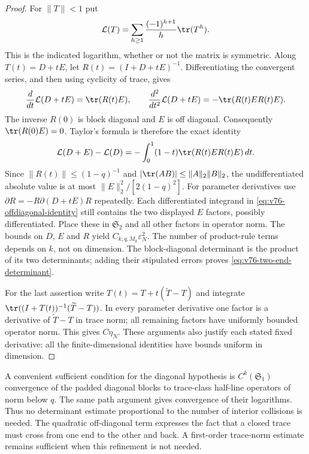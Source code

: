 \begin{proof}
For $\|T\|<1$ put
\[
 \mathcal L(T)=\sum_{h\ge1}\frac{(-1)^{h+1}}h\tr(T^h).
\]
This is the indicated logarithm, whether or not the matrix is symmetric.
Along $T(t)=D+tE$, let $R(t)=(I+D+tE)^{-1}$.  Differentiating the
convergent series, and then using cyclicity of trace, gives
\[
 \frac{d}{dt}\mathcal L(D+tE)=\tr(R(t)E),\qquad
 \frac{d^2}{dt^2}\mathcal L(D+tE)=-\tr(R(t)ER(t)E).
\]
The inverse $R(0)$ is block diagonal and $E$ is off diagonal.
Consequently $\tr(R(0)E)=0$.  Taylor's formula is therefore the exact
identity
\begin{equation}\label{eq:v76-offdiagonal-identity}
 \mathcal L(D+E)-\mathcal L(D)
 =-\int_0^1(1-t)\tr(R(t)ER(t)E)\,dt.
\end{equation}
Since $\|R(t)\|\le(1-q)^{-1}$ and
$|\tr(AB)|\le\|A\|_2\|B\|_2$, the undifferentiated absolute
value is at most $\|E\|_2^2/[2(1-q)^2]$.
For parameter derivatives use
$\partial R=-R\partial(D+tE)R$ repeatedly.  Each differentiated
integrand in \eqref{eq:v76-offdiagonal-identity} still contains the two
displayed $E$ factors, possibly differentiated.  Place these in
$\mathfrak S_2$ and all other factors in operator norm.  The bounds
on $D$, $E$ and $R$ yield $C_{k,q,M_k}\varepsilon_N^2$.
The number of product-rule terms depends on $k$, not on dimension.
The block-diagonal determinant is the product of its two determinants;
adding their stipulated errors proves \eqref{eq:v76-two-end-determinant}.

For the last assertion write $T(t)=T+t(\widetilde T-T)$ and integrate
$\tr((I+T(t))^{-1}(\widetilde T-T))$.  In every parameter derivative
one factor is a derivative of $\widetilde T-T$ in trace norm; all
remaining factors have uniformly bounded operator norm.  This gives
$C\eta_N$.  These arguments also justify each stated fixed derivative:
all the finite-dimensional identities have bounds uniform in dimension.
\end{proof}

A convenient sufficient condition for the diagonal hypothesis is
$C^k(\mathfrak S_1)$ convergence of the padded diagonal blocks to
trace-class half-line operators of norm below $q$.  The same path
argument gives convergence of their logarithms.  Thus no determinant
estimate proportional to the number of interior collisions is needed.
The quadratic off-diagonal term expresses the fact that a closed trace
must cross from one end to the other and back.  A first-order trace-norm
estimate remains sufficient when this refinement is not needed.

